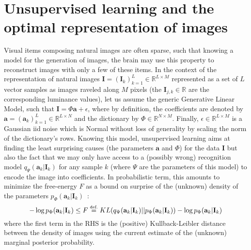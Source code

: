 \documentclass[a4paper, 11pt, draft]{article} %
\newcommand{\coef}{\mathbf{a}} %
\newcommand{\image}{\mathbf{I}} %
\newcommand{\dico}{\Phi} %
\newcommand{\eqdef}{\ensuremath{\stackrel{\mbox{\upshape\tiny def.}}{=}}}
\newcommand{\RR}{\mathbb{R}}
\begin{document}
\section{Unsupervised learning and the optimal representation of images}%
%
Visual items composing natural images are often sparse, such that knowing a model for the generation of images, the brain may use this property to reconstruct images with only a few of these items. 
In the context of the representation of natural images $\image = (\image_k)_{k=1}^L \in \RR^{L \times M}$ represented as a set of $L$ vector samples as images raveled along $M$ pixels (the $\image_{j, k} \in \RR$ are the corresponding luminance values), let us assume the generic Generative Linear Model, such that $\image = \dico \coef + \epsilon $, where by definition, the coefficients are denoted by $\coef = (\coef_k)_{k=1}^L \in \RR^{L \times N}$ and the dictionary by $\dico \in \RR^{N \times M}$. Finally, $\epsilon \in \RR^{L \times M}$ is a Gaussian iid noise which is Normal without loss of generality by scaling the norm of the dictionary's rows. Knowing this model, unsupervised learning aims at finding the least surprising causes (the parameters $\coef$ and $\dico$) for the data $\image$ but also the fact that we may only have access to a (possibly wrong) recognition model $q_\Psi(\coef_k | \image_k)$ for any sample $k$ (where $\Psi$ are the parameters of this model) to encode the image into coefficients. In probabilistic term, this amounts to minimize the free-energy $F$ as a bound on surprise of the (unknown) density of the parameters $p_\dico( \coef_k | \image_k)$~\citep{Friston12,Kingma13,Doersch2016}:
\begin{equation} -\log p_\dico( \coef_k | \image_k) \leq F \eqdef KL( q_\Psi(\coef_k | \image_k) || p_\dico( \coef_k | \image_k) )  -\log p_\dico( \coef_k | \image_k) \end{equation}
where the first term in the RHS is the (positive) Kullback-Leibler distance between the density of images using the current estimate of the (unknown) marginal posterior probability. 
\end{document}
